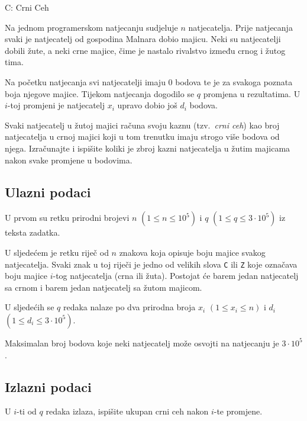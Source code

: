 \begin{statement}[
  timelimit=1 s,
  memorylimit=512 MiB,
]{C: Crni Ceh}

Na jednom programerskom natjecanju sudjeluje $n$ natjecatelja. Prije natjecanja
svaki je natjecatelj od gospodina Malnara dobio majicu. Neki su natjecatelji
dobili žute, a neki crne majice, čime je nastalo rivalstvo između crnog i žutog
tima.

Na početku natjecanja svi natjecatelji imaju $0$ bodova te je za svakoga poznata
boja njegove majice. Tijekom natjecanja dogodilo se $q$ promjena u rezultatima.
U $i$-toj promjeni je natjecatelj $x_i$ upravo dobio još $d_i$ bodova.

Svaki natjecatelj u žutoj majici računa svoju kaznu (tzv.\ \textit{crni ceh})
kao broj natjecatelja u crnoj majici koji u tom trenutku imaju strogo više
bodova od njega. Izračunajte i ispišite koliki je zbroj kazni natjecatelja u
žutim majicama nakon svake promjene u bodovima.

\subsection*{Ulazni podaci}
U prvom su retku prirodni brojevi $n$ $(1 \le n \le 10^5) $ i
$q$ $(1 \le q \le 3 \cdot 10^5)$ iz teksta zadatka.

U sljedećem je retku riječ od $n$ znakova koja opisuje boju majice svakog
natjecatelja. Svaki znak u toj riječi je jedno od velikih slova \texttt{C}
ili \texttt{Z} koje označava boju majice $i$-tog natjecatelja (crna ili žuta).
Postojat će barem jedan natjecatelj sa crnom i barem jedan natjecatelj sa žutom
majicom.

U sljedećih se $q$ redaka nalaze po dva prirodna broja $x_i$ $(1 \le x_i \le n)$ i
$d_i$ $(1 \le d_i \le 3 \cdot 10^5)$.

Maksimalan broj bodova koje neki natjecatelj može osvojti na natjecanju je
$3 \cdot 10^5$.

\subsection*{Izlazni podaci}
U $i$-ti od $q$ redaka izlaza, ispišite ukupan crni ceh nakon $i$-te promjene.


\end{statement}
